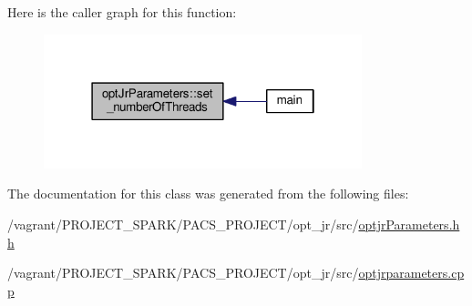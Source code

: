 Here is the caller graph for this function\-:\nopagebreak
\begin{figure}[H]
\begin{center}
\leavevmode
\includegraphics[width=262pt]{classoptJrParameters_a3747d78e5dd35b8b1aa1c037e9d91cf7_icgraph}
\end{center}
\end{figure}




The documentation for this class was generated from the following files\-:\begin{DoxyCompactItemize}
\item 
/vagrant/\-P\-R\-O\-J\-E\-C\-T\-\_\-\-S\-P\-A\-R\-K/\-P\-A\-C\-S\-\_\-\-P\-R\-O\-J\-E\-C\-T/opt\-\_\-jr/src/\hyperlink{optjrParameters_8hh}{optjr\-Parameters.\-hh}\item 
/vagrant/\-P\-R\-O\-J\-E\-C\-T\-\_\-\-S\-P\-A\-R\-K/\-P\-A\-C\-S\-\_\-\-P\-R\-O\-J\-E\-C\-T/opt\-\_\-jr/src/\hyperlink{optjrparameters_8cpp}{optjrparameters.\-cpp}\end{DoxyCompactItemize}
